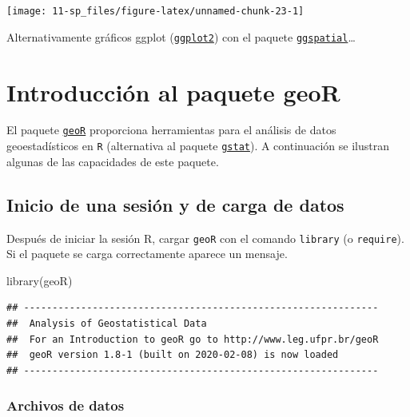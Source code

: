 \documentclass[
  spanish,
]{book}
\newenvironment{Shaded}{\begin{snugshade}}{\end{snugshade}}
\newcommand{\FunctionTok}[1]{\textcolor[rgb]{0.00,0.00,0.00}{#1}}
\newcommand{\NormalTok}[1]{#1}
\theoremstyle{break}
\theoremstyle{definition}
\theoremstyle{definition}
\theoremstyle{definition}
\theoremstyle{definition}
\theoremstyle{remark}
\begin{document}
\begin{center}\texttt{[image: 11-sp\_files/figure-latex/unnamed-chunk-23-1]} \end{center}

Alternativamente gráficos ggplot (\href{https://ggplot2.tidyverse.org}{\texttt{ggplot2}}) con el paquete \href{https://paleolimbot.github.io/ggspatial}{\texttt{ggspatial}}\ldots{}

\hypertarget{intro-geoR}{%
\chapter{\texorpdfstring{Introducción al paquete \textbf{geoR}}{Introducción al paquete geoR}}\label{intro-geoR}}

El paquete \href{http://www.leg.ufpr.br/geoR}{\texttt{geoR}} proporciona herramientas para el análisis de datos
geoestadísticos en \texttt{R}
(alternativa al paquete \href{http://r-spatial.github.io/gstat}{\texttt{gstat}}).
A continuación se ilustran algunas de las capacidades de este paquete.

\hypertarget{inicio-de-una-sesiuxf3n-y-de-carga-de-datos}{%
\section{Inicio de una sesión y de carga de datos}\label{inicio-de-una-sesiuxf3n-y-de-carga-de-datos}}

Después de iniciar la sesión R, cargar \texttt{geoR} con el comando \texttt{library} (o
\texttt{require}). Si el paquete se carga correctamente aparece un mensaje.

\begin{Shaded}
\begin{Highlighting}[]
\FunctionTok{library}\NormalTok{(geoR)}
\end{Highlighting}
\end{Shaded}

\begin{verbatim}
## --------------------------------------------------------------
##  Analysis of Geostatistical Data
##  For an Introduction to geoR go to http://www.leg.ufpr.br/geoR
##  geoR version 1.8-1 (built on 2020-02-08) is now loaded
## --------------------------------------------------------------
\end{verbatim}

\hypertarget{archivos-de-datos}{%
\subsection{Archivos de datos}\label{archivos-de-datos}}
\end{document}
